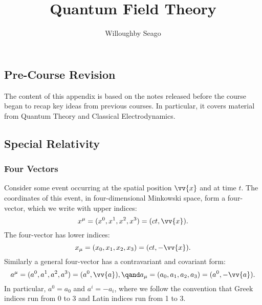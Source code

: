 \documentclass[fleqn]{NotesClass}
\title{Quantum Field Theory}
\author{Willoughby Seago}
\date{}
\begin{document}
    \frontmatter
    \titlepage
    \innertitlepage{}
    \tableofcontents
    \listoffigures
    \mainmatter
    
    
    \appendixpage
    \begin{appendices}
        \chapter{Pre-Course Revision}
        The content of this appendix is based on the notes released before the course began to recap key ideas from previous courses.
        In particular, it covers material from Quantum Theory and Classical Electrodynamics.
        
        \section{Special Relativity}
        \subsection{Four Vectors}
        Consider some event occurring at the spatial position \(\vv{x}\) and at time \(t\).
        The coordinates of this event, in four-dimensional Minkowski space, form a  four-vector, which we write with upper indices:
        \begin{equation}
            x^\mu = (x^0, x^1, x^2, x^3) = (ct, \vv{x}).
        \end{equation}
        The  four-vector has lower indices:
        \begin{equation}
            x_\mu = (x_0, x_1, x_2, x_3) = (ct, -\vv{x}).
        \end{equation}
        Similarly a general four-vector has a contravariant and covariant form:
        \begin{equation}
            a^\mu = (a^0, a^1, a^2, a^3) = (a^0, \vv{a}), \qand a_\mu = (a_0, a_1, a_2, a_3) = (a^0, -\vv{a}).
        \end{equation}
        In particular, \(a^0 = a_0\) and \(a^i = -a_i\), where we follow the convention that Greek indices run from 0 to 3 and Latin indices run from 1 to 3.
        

\end{appendices}
\end{document}
